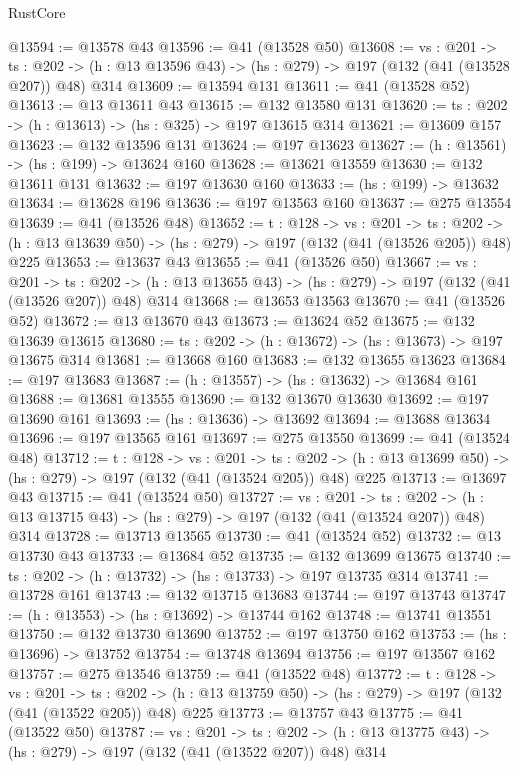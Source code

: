 \begin{lexlean}{RustCore}
\begin{coremodule}
@13594 := @13578 @43
@13596 := @41 (@13528 @50)
@13608 := {vs : @201} ->
  {ts : @202} -> (h : @13 @13596 @43) -> (hs : @279) -> @197 (@132 (@41 (@13528 @207)) @48) @314
@13609 := @13594 @131
@13611 := @41 (@13528 @52)
@13613 := @13 @13611 @43
@13615 := @132 @13580 @131
@13620 := {ts : @202} -> (h : @13613) -> (hs : @325) -> @197 @13615 @314
@13621 := @13609 @157
@13623 := @132 @13596 @131
@13624 := @197 @13623
@13627 := (h : @13561) -> (hs : @199) -> @13624 @160
@13628 := @13621 @13559
@13630 := @132 @13611 @131
@13632 := @197 @13630 @160
@13633 := (hs : @199) -> @13632
@13634 := @13628 @196
@13636 := @197 @13563 @160
@13637 := @275 @13554
@13639 := @41 (@13526 @48)
@13652 := {t : @128} ->
  {vs : @201} ->
  {ts : @202} -> (h : @13 @13639 @50) -> (hs : @279) -> @197 (@132 (@41 (@13526 @205)) @48) @225
@13653 := @13637 @43
@13655 := @41 (@13526 @50)
@13667 := {vs : @201} ->
  {ts : @202} -> (h : @13 @13655 @43) -> (hs : @279) -> @197 (@132 (@41 (@13526 @207)) @48) @314
@13668 := @13653 @13563
@13670 := @41 (@13526 @52)
@13672 := @13 @13670 @43
@13673 := @13624 @52
@13675 := @132 @13639 @13615
@13680 := {ts : @202} -> (h : @13672) -> (hs : @13673) -> @197 @13675 @314
@13681 := @13668 @160
@13683 := @132 @13655 @13623
@13684 := @197 @13683
@13687 := (h : @13557) -> (hs : @13632) -> @13684 @161
@13688 := @13681 @13555
@13690 := @132 @13670 @13630
@13692 := @197 @13690 @161
@13693 := (hs : @13636) -> @13692
@13694 := @13688 @13634
@13696 := @197 @13565 @161
@13697 := @275 @13550
@13699 := @41 (@13524 @48)
@13712 := {t : @128} ->
  {vs : @201} ->
  {ts : @202} -> (h : @13 @13699 @50) -> (hs : @279) -> @197 (@132 (@41 (@13524 @205)) @48) @225
@13713 := @13697 @43
@13715 := @41 (@13524 @50)
@13727 := {vs : @201} ->
  {ts : @202} -> (h : @13 @13715 @43) -> (hs : @279) -> @197 (@132 (@41 (@13524 @207)) @48) @314
@13728 := @13713 @13565
@13730 := @41 (@13524 @52)
@13732 := @13 @13730 @43
@13733 := @13684 @52
@13735 := @132 @13699 @13675
@13740 := {ts : @202} -> (h : @13732) -> (hs : @13733) -> @197 @13735 @314
@13741 := @13728 @161
@13743 := @132 @13715 @13683
@13744 := @197 @13743
@13747 := (h : @13553) -> (hs : @13692) -> @13744 @162
@13748 := @13741 @13551
@13750 := @132 @13730 @13690
@13752 := @197 @13750 @162
@13753 := (hs : @13696) -> @13752
@13754 := @13748 @13694
@13756 := @197 @13567 @162
@13757 := @275 @13546
@13759 := @41 (@13522 @48)
@13772 := {t : @128} ->
  {vs : @201} ->
  {ts : @202} -> (h : @13 @13759 @50) -> (hs : @279) -> @197 (@132 (@41 (@13522 @205)) @48) @225
@13773 := @13757 @43
@13775 := @41 (@13522 @50)
@13787 := {vs : @201} ->
  {ts : @202} -> (h : @13 @13775 @43) -> (hs : @279) -> @197 (@132 (@41 (@13522 @207)) @48) @314

\end{coremodule}
\end{lexlean}
